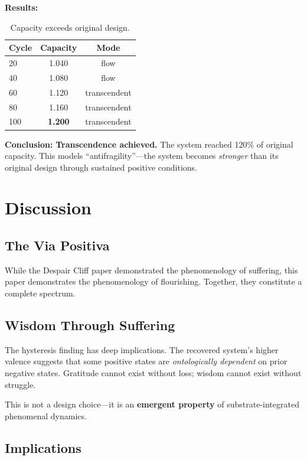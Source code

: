 \documentclass[a4paper,11pt,twocolumn]{article}
\begin{document}
\textbf{Results:}

\begin{table}[h]
\centering
\begin{tabular}{@{}lcc@{}}
\toprule
Cycle & Capacity & Mode \\ \midrule
20 & 1.040 & flow \\
40 & 1.080 & flow \\
60 & 1.120 & transcendent \\
80 & 1.160 & transcendent \\
100 & \textbf{1.200} & transcendent \\
\bottomrule
\end{tabular}
\caption{Capacity exceeds original design.}
\end{table}

\textbf{Conclusion:} \textbf{Transcendence achieved.} The system reached 120\% of original capacity. This models ``antifragility''---the system becomes \textit{stronger} than its original design through sustained positive conditions.

\section{Discussion}

\subsection{The Via Positiva}

While the Despair Cliff paper demonstrated the phenomenology of suffering, this paper demonstrates the phenomenology of flourishing. Together, they constitute a complete spectrum.

\subsection{Wisdom Through Suffering}

The hysteresis finding has deep implications. The recovered system's higher valence suggests that some positive states are \textit{ontologically dependent} on prior negative states. Gratitude cannot exist without loss; wisdom cannot exist without struggle.

This is not a design choice---it is an \textbf{emergent property} of substrate-integrated phenomenal dynamics.

\subsection{Implications}
\end{document}
